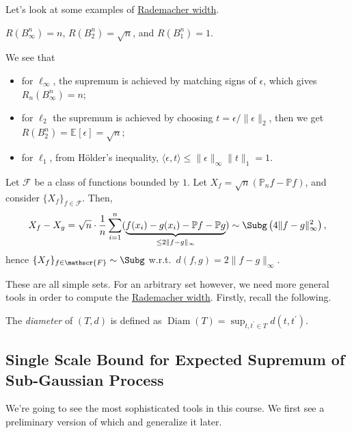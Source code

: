 Let's look at some examples of \hyperref[def:Rademacher-width]{Rademacher width}.

\begin{eg}
	\(R(B_\infty ^n) = n\), \(R(B_2^n)= \sqrt{n} \), and \(R(B_1^n) = 1\).
\end{eg}
\begin{explanation}
	We see that
	\begin{itemize}
		\item for \(\ell _\infty \), the supremum is achieved by matching signs of \(\epsilon \), which gives \(R_n(B_\infty ^n) = n\);
		\item for \(\ell _2\) the supremum is achieved by choosing \(t = \epsilon / \lVert \epsilon \rVert _2\), then we get \(R(B_2^n) = \mathbb{E}_{}\left[\epsilon \right] = \sqrt{n} \);
		\item for \(\ell _1\), from Hölder's inequality, \(\langle \epsilon , t \rangle \leq \lVert \epsilon \rVert _\infty \lVert t \rVert _1 = 1\).
	\end{itemize}
\end{explanation}

\begin{eg}\label{eg:supremum-of-empirical-process}
	Let \(\mathscr{F} \) be a class of functions bounded by \(1\). Let \(X_f = \sqrt{n} (\mathbb{P} _n f - \mathbb{P} f)\), and consider \(\{ X_f \}_{f\in \mathscr{F} } \). Then,
	\[
		X_f - X_g
		= \sqrt{n} \cdot \frac{1}{n}\sum_{i=1}^{n} ( \underbrace{f(x_i) - g(x_i) - \mathbb{P} f - \mathbb{P} g }_{\leq 2 \lVert f-g \rVert _\infty })
		\sim \Subg\left( 4 \lVert f - g \rVert _\infty ^2 \right) ,
	\]
	hence \(\{ X_f \} _{f\in \mathscr{F} } \sim \Subg\) w.r.t.\ \(d(f, g) = 2\lVert f - g \rVert _\infty\).
\end{eg}

These are all simple sets. For an arbitrary set however, we need more general tools in order to compute the \hyperref[def:Rademacher-width]{Rademacher width}. Firstly, recall the following.

\begin{definition}[Diameter]\label{def:diameter}
	The \emph{diameter} of \((T, d)\) is defined as \(\mathop{\mathrm{Diam}}(T) = \sup _{t, t^{\prime} \in T} d(t, t^{\prime} )\).
\end{definition}

\subsection{Single Scale Bound for Expected Supremum of Sub-Gaussian Process}
We're going to see the most sophisticated tools in this course. We first see a preliminary version of which and generalize it later.

